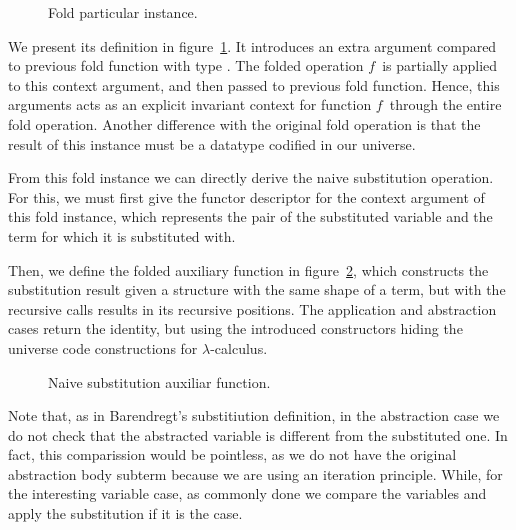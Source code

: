 \documentclass{book}
\begin{document}



\begin{figure}[h]
  \caption{Fold particular instance.}
  \label{fig:foldCtx}
\end{figure}

We present its definition in figure~\ref{fig:foldCtx}. It introduces an extra argument compared to previous fold function with type . The folded operation $f$\ is partially applied to this context argument, and then passed to previous fold function. Hence, this arguments acts as an explicit invariant context for function $f$\ through the entire fold operation. Another difference with the original fold operation is that the result of this instance must be a datatype  codified in our universe.

From this fold instance we can directly derive the naive substitution operation. For this, we must first give the functor descriptor  for the context argument of this fold instance, which represents the pair of the substituted variable and the term for which it is substituted with. 


Then, we define the folded auxiliary function  in figure~\ref{fig:substaux}, which constructs the substitution result given a structure with the same shape of a term, but with the recursive calls results in its recursive positions. The application and abstraction cases return the identity, but using the introduced constructors hiding the universe code constructions for $\lambda$-calculus. 

\begin{figure}[h]
  \caption{Naive substitution auxiliar function.}
\label{fig:substaux}
\end{figure}

Note that, as in Barendregt's substitiution definition, in the abstraction case we do not check that the abstracted variable is different from the substituted one. In fact, this comparission would be pointless, as we do not have the original abstraction body subterm because we are using an iteration principle. While, for the interesting variable case, as commonly done we compare the variables and apply the substitution if it is the case. 
\end{document}
